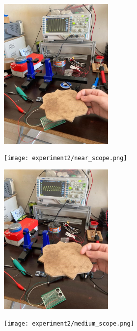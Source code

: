 \documentclass[12pt, a4paper]{article}
\begin{document}
        \begin{figure}[H]\centering
            \includegraphics[width=0.5\textwidth]{experiment2/near.jpg}
            \caption[]{}\label{fig:near}
        \end{figure}

        \begin{figure}[H]\centering
            \texttt{[image: experiment2/near\_scope.png]}
            \caption[]{}\label{fig:ner_scope}
        \end{figure}


        \begin{figure}[H]\centering
            \includegraphics[width=0.5\textwidth]{experiment2/medium.jpg}
            \caption[]{}\label{fig:medium}
        \end{figure}

        \begin{figure}[H]\centering
            \texttt{[image: experiment2/medium\_scope.png]}
            \caption[]{}\label{fig:medium_scope}
        \end{figure}
\end{document}
